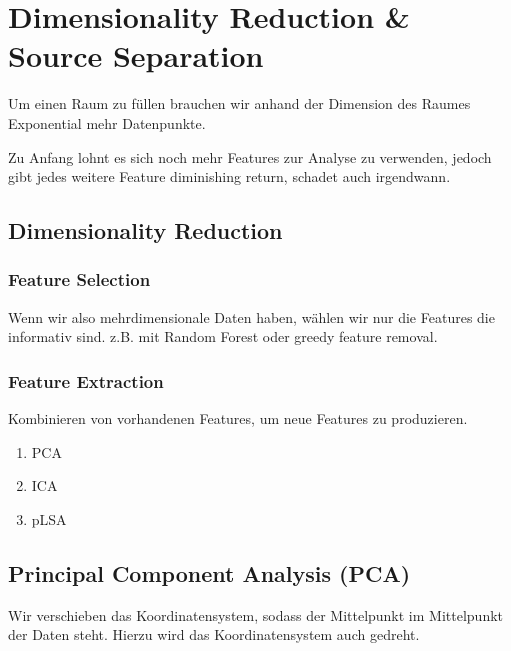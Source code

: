 \documentclass[a4paper]{article}
\title{\docTitle}
\author{Moritz}
\date{\today}
\begin{document}
\maketitle
\tableofcontents


\section{Dimensionality Reduction \& Source Separation}

Um einen Raum zu füllen brauchen wir anhand der Dimension des Raumes Exponential mehr Datenpunkte.

Zu Anfang lohnt es sich noch mehr Features zur Analyse zu verwenden, jedoch gibt jedes weitere Feature diminishing return, schadet auch irgendwann.

\subsection{Dimensionality Reduction}

\subsubsection{Feature Selection}

Wenn wir also mehrdimensionale Daten haben, wählen wir nur die Features die informativ sind. z.B. mit Random Forest oder greedy feature removal.

\subsubsection{Feature Extraction}

Kombinieren von vorhandenen Features, um neue Features zu produzieren.

\begin{enumerate}
    \item PCA
    \item ICA
    \item pLSA
\end{enumerate}

\subsection{Principal Component Analysis (PCA)}

Wir verschieben das Koordinatensystem, sodass der Mittelpunkt im Mittelpunkt der Daten steht. Hierzu wird das Koordinatensystem auch gedreht.
\end{document}
